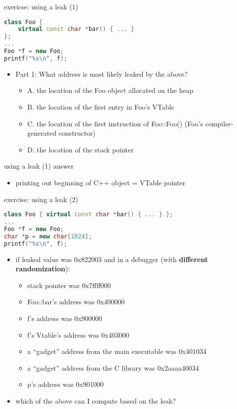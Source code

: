 \begin{frame}[fragile,label=useLeak1]{exericse: using a leak (1)}
\begin{lstlisting}[language=C++,style=small]
class Foo {
    virtual const char *bar() { ... }
};
...
Foo *f = new Foo;
printf("%s\n", f);
\end{lstlisting}
\begin{itemize}
\item Part 1: What address is most likely leaked by the above?
    \begin{itemize}
    \item A. the location of the Foo object allocated on the heap
    \item B. the location of the first entry in Foo's VTable
    \item C. the location of the first instruction of Foo::Foo() (Foo's compiler-generated constructor)
    \item D. the location of the stack pointer
    \end{itemize}
\end{itemize}
\end{frame}

\begin{frame}{using a leak (1) answer}
\begin{itemize}
\item printing out beginning of C++ object = VTable pointer
\end{itemize}
\end{frame}


\begin{frame}[fragile,label=useLeak2]{exercise: using a leak (2)}
\begin{lstlisting}[language=C++,style=script]
class Foo { virtual const char *bar() { ... } };
...
Foo *f = new Foo;
char *p = new char[1024];
printf("%s\n", f);
\end{lstlisting}
\begin{itemize}
\item if leaked value was 0x822003 and in a debugger (with \textbf{different randomization}):
    \begin{itemize}
    \item stack pointer was 0x7ffff000
    \item Foo::bar's address was 0x400000
    \item f's address was 0x900000
    \item f's Vtable's address was 0x403000
    \item a ``gadget'' address from the main executable was 0x401034
    \item a ``gadget'' address from the C library was 0x2aaaa40034
    \item p's address was 0x901000
    \end{itemize}
\item which of the above can I compute based on the leak?
\end{itemize}
\end{frame}


